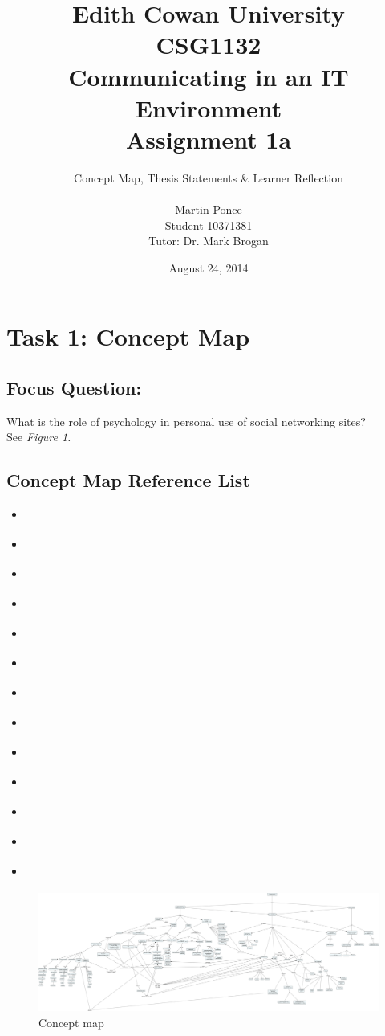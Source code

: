 \documentclass[12pt,a4paper]{report}
\title{Edith Cowan University\\CSG1132\\Communicating in an IT Environment\\Assignment 1a}
\author{Concept Map, Thesis Statements \& Learner Reflection\\\\
		Martin Ponce\\Student 10371381\\Tutor: Dr. Mark Brogan}
\date{August 24, 2014}
\begin{document}
\maketitle

\makeatletter
\tableofcontents

\newpage
\section*{\textsf{Task 1: Concept Map}}

\subsection*{\textsf{Focus Question:}}
What is the role of psychology in personal use of social networking sites?\\

See \emph{Figure 1.}

\subsection*{\textsf{Concept Map Reference List}}
\begin{itemize}
\item \citet*{Pai2013}
\item \citet*{McAndrew2012}
\item \citet*{Nadkarni2012}
\item \citet*{Moore2012}
\item \citet*{Ross2009}
\item \citet*{Toma2013}
\item \citet*{Ellison2007}
\item \citet*{Park2011}
\item \citet*{Anderson2012}
\item \citet*{Ku2013}
\item \citet*{Rosen2013}
\item \citet*{Trottier2012}
\item \citet*{Kwan2013}
\end{itemize}

\newpage
{}
\thispagestyle{fancylscape}
\begin{landscape}
\begin{figure}[H]
	\centering
	\caption{Concept map}
	\includegraphics[scale=0.13]{./img/test.png}
\end{figure}
\end{landscape}
\restoregeometry
\end{document}
